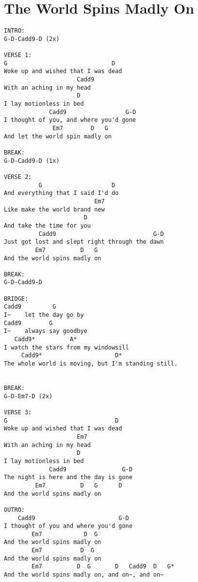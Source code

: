 \documentclass[leqno]{memoir}
\begin{document}
\chapter{The World Spins Madly On}
\begin{verbatim}
INTRO:
G-D-Cadd9-D (2x)

VERSE 1:
G                              D
Woke up and wished that I was dead
                     Cadd9
With an aching in my head
                     D
I lay motionless in bed
             Cadd9                 G-D
I thought of you, and where you'd gone
              Em7        D   G
And let the world spin madly on

BREAK:
G-D-Cadd9-D (1x)

VERSE 2:
          G                    D
And everything that I said I'd do
                          Em7
Like make the world brand new
                       D
And take the time for you
          Cadd9                            G-D
Just got lost and slept right through the dawn
         Em7          D   G
And the world spins madly on

BREAK:
G-D-Cadd9-D

BRIDGE:
Cadd9         G
I~    let the day go by
Cadd9        G
I~    always say goodbye
   Cadd9*          A*
I watch the stars from my windowsill
     Cadd9*                     D*
The whole world is moving, but I'm standing still.


BREAK:
G-D-Em7-D (2x)

VERSE 3:
G                               D
Woke up and wished that I was dead
                     Em7
With an aching in my head
                     D
I lay motionless in bed
             Cadd9                G-D
The night is here and the day is gone
         Em7          D   G      D
And the world spins madly on

OUTRO:         
    Cadd9                        G-D
I thought of you and where you'd gone
        Em7            D  G
And the world spins madly on
        Em7           D  G
And the world spins madly on
        Em7          D  G       D   Cadd9  D   G*
And the world spins madly on, and on~, and on~
\end{verbatim}
\newpage
\end{document}
